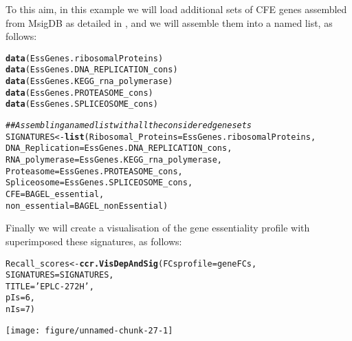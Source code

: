 \documentclass{article}\usepackage[]{graphicx}\usepackage[]{color}
\makeatletter
\def\maxwidth{ %
  \ifdim\Gin@nat@width>\linewidth
    \linewidth
  \else
    \Gin@nat@width
  \fi
}
\newcommand{\hlnum}[1]{\textcolor[rgb]{0.686,0.059,0.569}{#1}}%
\newcommand{\hlstr}[1]{\textcolor[rgb]{0.192,0.494,0.8}{#1}}%
\newcommand{\hlcom}[1]{\textcolor[rgb]{0.678,0.584,0.686}{\textit{#1}}}%
\newcommand{\hlstd}[1]{\textcolor[rgb]{0.345,0.345,0.345}{#1}}%
\newcommand{\hlkwb}[1]{\textcolor[rgb]{0.69,0.353,0.396}{#1}}%
\newcommand{\hlkwc}[1]{\textcolor[rgb]{0.333,0.667,0.333}{#1}}%
\newcommand{\hlkwd}[1]{\textcolor[rgb]{0.737,0.353,0.396}{\textbf{#1}}}%
\newenvironment{kframe}{%
 \def\at@end@of@kframe{}%
 \ifinner\ifhmode%
  \def\at@end@of@kframe{\end{minipage}}%
  \begin{minipage}{\columnwidth}%
 \fi\fi%
 \def\FrameCommand##1{\hskip\@totalleftmargin \hskip-\fboxsep
 \colorbox{shadecolor}{##1}\hskip-\fboxsep
     \hskip-\linewidth \hskip-\@totalleftmargin \hskip\columnwidth}%
 \MakeFramed {\advance\hsize-\width
   \@totalleftmargin\z@ \linewidth\hsize
   \@setminipage}}%
 {\par\unskip\endMakeFramed%
 \at@end@of@kframe}
\newenvironment{knitrout}{}{} %
\makeatother
\begin{document}
To this aim, in this example we will load additional sets of CFE genes assembled from MsigDB \cite{Subramanian:2005wu} as detailed in \cite{Iorio:2017}, and we will assemble them into a named list, as follows:

\begin{knitrout}
\color{fgcolor}\begin{kframe}
\begin{alltt}
\hlkwd{data}\hlstd{(EssGenes.ribosomalProteins)}
\hlkwd{data}\hlstd{(EssGenes.DNA_REPLICATION_cons)}
\hlkwd{data}\hlstd{(EssGenes.KEGG_rna_polymerase)}
\hlkwd{data}\hlstd{(EssGenes.PROTEASOME_cons)}
\hlkwd{data}\hlstd{(EssGenes.SPLICEOSOME_cons)}

\hlcom{## Assembling a named list with all the considered gene sets}
\hlstd{SIGNATURES}\hlkwb{<-}\hlkwd{list}\hlstd{(}\hlkwc{Ribosomal_Proteins}\hlstd{=EssGenes.ribosomalProteins,}
                 \hlkwc{DNA_Replication} \hlstd{= EssGenes.DNA_REPLICATION_cons,}
                 \hlkwc{RNA_polymerase} \hlstd{= EssGenes.KEGG_rna_polymerase,}
                 \hlkwc{Proteasome} \hlstd{= EssGenes.PROTEASOME_cons,}
                 \hlkwc{Spliceosome} \hlstd{= EssGenes.SPLICEOSOME_cons,}
                 \hlkwc{CFE} \hlstd{= BAGEL_essential,}
                 \hlkwc{non_essential} \hlstd{= BAGEL_nonEssential)}
\end{alltt}
\end{kframe}
\end{knitrout}

Finally we will create a visualisation of the gene essentiality profile with superimposed these signatures, as follows:

\begin{knitrout}
\color{fgcolor}\begin{kframe}
\begin{alltt}
\hlstd{Recall_scores}\hlkwb{<-}\hlkwd{ccr.VisDepAndSig}\hlstd{(}\hlkwc{FCsprofile} \hlstd{= geneFCs,}
                            \hlkwc{SIGNATURES} \hlstd{= SIGNATURES,}
                            \hlkwc{TITLE} \hlstd{=} \hlstr{'EPLC-272H'}\hlstd{,}
                            \hlkwc{pIs} \hlstd{=} \hlnum{6}\hlstd{,}
                            \hlkwc{nIs} \hlstd{=} \hlnum{7}\hlstd{)}
\end{alltt}
\end{kframe}

{\centering \texttt{[image: figure/unnamed-chunk-27-1]} 

}



\end{knitrout}
\end{document}
